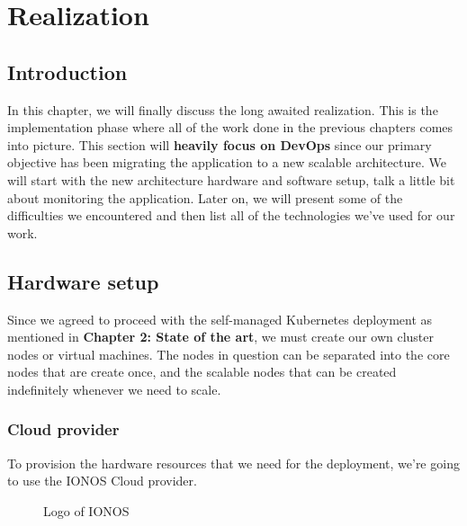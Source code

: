 \chapter{Realization}
\minitoc
\newpage

\setcounter{secnumdepth}{0} %
\section{Introduction}
In this chapter, we will finally discuss the long awaited realization.
This is the implementation phase where all of the work done in the previous chapters comes into picture.
This section will {\bf heavily focus on DevOps} since our primary objective has been migrating the  application to a new scalable architecture.
We will start with the new architecture hardware and software setup, talk a little bit about monitoring the application.
Later on, we will present some of the difficulties we encountered and then list all of the technologies we've used for our work.

\setcounter{secnumdepth}{2} %
\section{Hardware setup}
Since we agreed to proceed with the self-managed Kubernetes deployment as mentioned in \textbf{Chapter 2: State of the art}, we must create our own cluster nodes or virtual machines.
The nodes in question can be separated into the core nodes that are create once, and the scalable nodes that can be created indefinitely whenever we need to scale.

\subsection{Cloud provider}
To provision the hardware resources that we need for the deployment, we're going  to use the IONOS Cloud provider.
\cite[Ionos is a web hosting company founded in Germany in 1988 and is currently owned by United Internet.]{ionos-wikipedia}
\begin{figure}[H]
    \centering
    \caption{Logo of IONOS}
    \label{fig:logo-of-ionos-cloud}
\end{figure}

